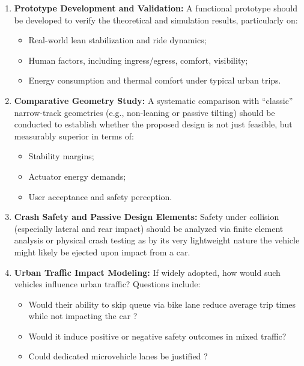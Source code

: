 \begin{enumerate}
    \item \textbf{Prototype Development and Validation:}  
    A functional prototype should be developed to verify the theoretical and simulation results, particularly on:
    \begin{itemize}
        \item Real-world lean stabilization and ride dynamics;
        \item Human factors, including ingress/egress, comfort, visibility;
        \item Energy consumption and thermal comfort under typical urban trips.
    \end{itemize}
    
    \item \textbf{Comparative Geometry Study:}  
    A systematic comparison with “classic” narrow-track geometries (e.g., non-leaning or passive tilting) should be conducted to establish whether the proposed design is not just feasible, but measurably superior in terms of:
    \begin{itemize}
        \item Stability margins;
        \item Actuator energy demands;
        \item User acceptance and safety perception.
    \end{itemize}

    \item \textbf{Crash Safety and Passive Design Elements:}  
    Safety under collision (especially lateral and rear impact) should be analyzed via finite element analysis or physical crash testing as by its very lightweight nature the vehicle might likely be ejected upon impact from a car.

    \item \textbf{Urban Traffic Impact Modeling:}  
    If widely adopted, how would such vehicles influence urban traffic? Questions include:
    \begin{itemize}
        \item Would their ability to skip queue via bike lane reduce average trip times while not impacting the car ?
        \item Would it induce positive or negative safety outcomes in mixed traffic?
        \item Could dedicated microvehicle lanes be justified ?
    \end{itemize}


\end{enumerate}
